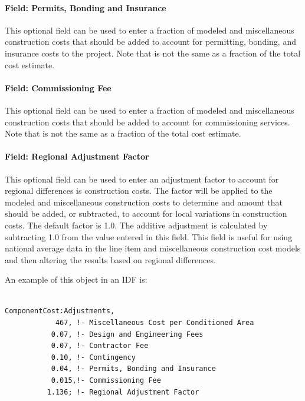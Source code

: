 \paragraph{Field: Permits, Bonding and Insurance}\label{field-permits-bonding-and-insurance}

This optional field can be used to enter a fraction of modeled and miscellaneous construction costs that should be added to account for permitting, bonding, and insurance costs to the project. Note that is not the same as a fraction of the total cost estimate.

\paragraph{Field: Commissioning Fee}\label{field-commissioning-fee}

This optional field can be used to enter a fraction of modeled and miscellaneous construction costs that should be added to account for commissioning services. Note that is not the same as a fraction of the total cost estimate.

\paragraph{Field: Regional Adjustment Factor}\label{field-regional-adjustment-factor}

This optional field can be used to enter an adjustment factor to account for regional differences is construction costs. The factor will be applied to the modeled and miscellaneous construction costs to determine and amount that should be added, or subtracted, to account for local variations in construction costs. The default factor is 1.0. The additive adjustment is calculated by subtracting 1.0 from the value entered in this field. This field is useful for using national average data in the line item and miscellaneous construction cost models and then altering the results based on regional differences.

An example of this object in an IDF is:

\begin{lstlisting}

ComponentCost:Adjustments,
            467, !- Miscellaneous Cost per Conditioned Area
           0.07, !- Design and Engineering Fees
           0.07, !- Contractor Fee
           0.10, !- Contingency
           0.04, !- Permits, Bonding and Insurance
           0.015,!- Commissioning Fee
          1.136; !- Regional Adjustment Factor
\end{lstlisting}


